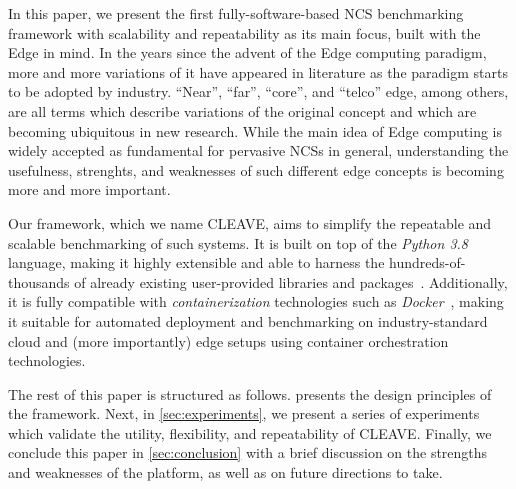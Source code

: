 In this paper, we present the first fully-software-based \ac{NCS} benchmarking framework with scalability and repeatability as its main focus, built with the Edge in mind.
In the years since the advent of the Edge computing paradigm, more and more variations of it have appeared in literature as the paradigm starts to be adopted by industry.
``Near'', ``far'', ``core'', and ``telco'' edge, among others, are all terms which describe variations of the original concept and which are becoming ubiquitous in new research.
While the main idea of Edge computing is widely accepted as fundamental for pervasive \acp{NCS} in general, understanding the usefulness, strenghts, and weaknesses of such different edge concepts is becoming more and more important.

Our framework, which we name \ac{CLEAVE}, aims to simplify the repeatable and scalable benchmarking of such systems. 
It is built on top of the \emph{Python 3.8}~\cite{Python3.8} language, making it highly extensible and able to harness the hundreds-of-thousands of already existing user-provided libraries and packages~\cite{pypi}.
Additionally, it is fully compatible with \emph{containerization} technologies such as \emph{Docker}~\cite{merkel2014docker}, making it suitable for automated deployment and benchmarking on industry-standard cloud and (more importantly) edge setups using container orchestration technologies.

The rest of this paper is structured as follows.
 presents the design principles of the framework.
Next, in \cref{sec:experiments}, we present a series of experiments which validate the utility, flexibility, and repeatability of \ac{CLEAVE}.
Finally, we conclude this paper in \cref{sec:conclusion} with a brief discussion on the strengths and weaknesses of the platform, as well as on future directions to take.